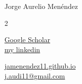 
\begin{center}

    {\LARGE Jorge Aurelio Men\'endez} \\ \vspace{2pt}
    \begin{multicols}{2}
    \begin{flushleft}
        \href{{https://scholar.google.com/citations?user=YPAOERQAAAAJ&hl=en&oi=ao}}{Google Scholar}\\
        \href{{your linkedin link}}{my linkedin}
    \end{flushleft}
    
    \begin{flushright}
        \href{{https://jamenendez11.github.io/}}{jamenendez11.github.io}\\
        \href{mailto:{j.audi11@gmail.com}}{j.audi11@gmail.com}
    \end{flushright}
    \end{multicols}
    
\end{center}